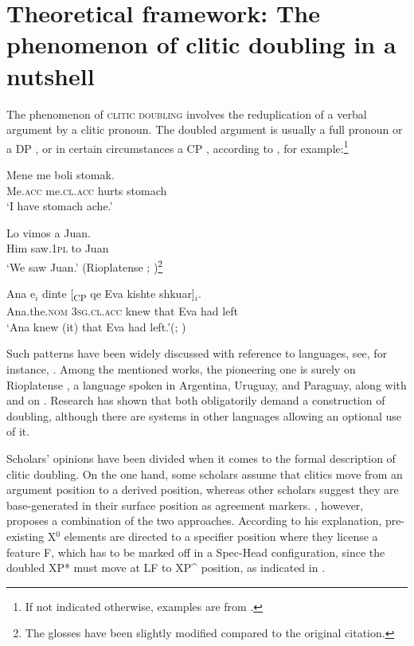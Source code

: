 \documentclass[output=paper,
colorlinks,
citecolor=brown,
newtxmath
]{langscibook}
\begin{document}

\section{Theoretical framework: The phenomenon of clitic doubling in a nutshell}\label{sec:framework}
The phenomenon of \textsc{clitic doubling} involves the reduplication of a verbal argument by a clitic pronoun. The doubled argument is usually a full pronoun  or a DP , or in certain circumstances a CP , according to \citet[1--4]{Kallulli.Tasmowski2008}, for example:\footnote{If not indicated otherwise, examples are from .}


\ea\label{ex:zivojinovic:1}
\gll Mene me boli stomak. \\
     Me.\textsc{acc} me.\textsc{cl.acc} hurts stomach \\
\glt `I have stomach ache.'
\z


\ea\label{ex:zivojinovic:2}
\gll Lo	vimos a Juan.\\
     Him saw.\textsc{1pl}	to Juan \\
\glt `We saw Juan.' \hfill (Rioplatense ; \citealt[32]{Jaeggli1986})\footnote{The glosses have been slightly modified compared to the original citation.}
\z


\ea\label{ex:zivojinovic:3}
\gll Ana	e$_i$ dinte	[\textsubscript{CP} qe Eva kishte shkuar]$_i$.
\\
     Ana.the.\textsc{nom} \textsc{3sg.cl.acc} knew {} that Eva had left\\
\glt `Ana knew (it) that Eva had left.'\hfill (; \citealt[2]{Kallulli.Tasmowski2008})
\z

\noindent Such patterns have been widely discussed with reference to  languages, see, for instance, \citet{Jaeggli1982, Jaeggli1986, Kayne1991, Sportiche1996}. Among the mentioned works, the pioneering one is surely \citet{Jaeggli1982} on Rioplatense , a language spoken in Argentina, Uruguay, and Paraguay, along with \citet{Farkas1978} and \citet{Steriade1980} on . Research has shown that both obligatorily demand a construction of doubling, although there are systems in other languages allowing an optional use of it.

Scholars' opinions have been divided when it comes to the formal description of clitic doubling. On the one hand, some scholars assume that clitics move from an argument position to a derived position, whereas other scholars suggest they are base-generated in their surface position as agreement markers. \citet{Sportiche1996}, however, proposes a combination of the two approaches. According to his explanation, pre-existing X$^{0}$ elements are directed to a specifier position where they license a feature F, which has to be marked off in a Spec-Head configuration, since the doubled XP* must move at LF to XP\^{} position, as indicated in .
\end{document}
